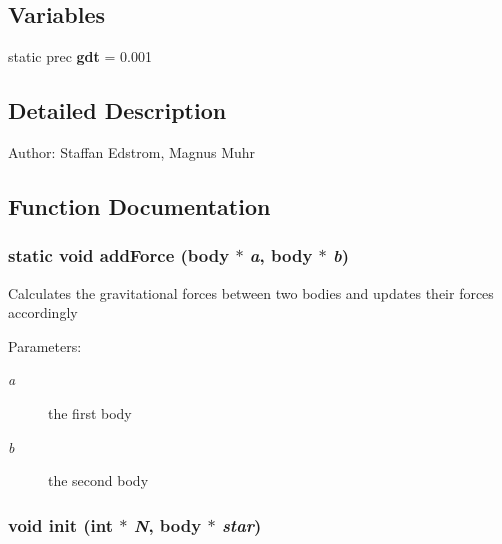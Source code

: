 \subsection*{Variables}
\begin{CompactItemize}
\item 
\hypertarget{main-iter_8c_1fbf28d851e0c80a478859ec0c539a5a}{
static prec \textbf{gdt} = 0.001}
\label{main-iter_8c_1fbf28d851e0c80a478859ec0c539a5a}

\end{CompactItemize}


\subsection{Detailed Description}
\begin{Desc}
\item[Author:]Staffan Edstrom, Magnus Muhr \end{Desc}


\subsection{Function Documentation}
\hypertarget{main-iter_8c_e6e907402026ca4699b0da99978b5be7}{
\subsubsection[{addForce}]{\setlength{\rightskip}{0pt plus 5cm}static void addForce (body $\ast$ {\em a}, \/  body $\ast$ {\em b})}}
\label{main-iter_8c_e6e907402026ca4699b0da99978b5be7}


Calculates the gravitational forces between two bodies and updates their forces accordingly \begin{Desc}
\item[Parameters:]
\begin{description}
\item[{\em a}]the first body \item[{\em b}]the second body \end{description}
\end{Desc}
\hypertarget{main-iter_8c_ce5e968cf7efbcb4411b217c194a9646}{
\subsubsection[{init}]{\setlength{\rightskip}{0pt plus 5cm}void init (int $\ast$ {\em N}, \/  body $\ast$ {\em star})}}
\label{main-iter_8c_ce5e968cf7efbcb4411b217c194a9646}


